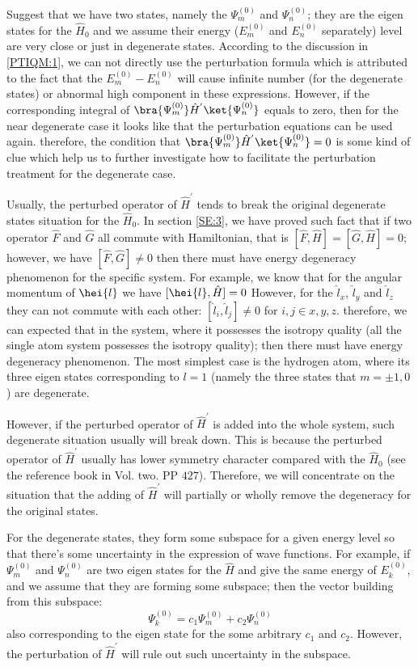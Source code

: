 Suggest that we have two states, namely the $\Psi_{m}^{(0)}$ and
$\Psi_{n}^{(0)}$; they are the eigen states for the $\hat{H}_{0}$
and we assume their energy ($E_{m}^{(0)}$ and $E_{n}^{(0)}$
separately) level are very close or just in degenerate states.
According to the discussion in \ref{PTIQM:1}, we can not directly
use the perturbation formula which is attributed to the fact that
the $E_{m}^{(0)} - E_{n}^{(0)}$ will cause infinite number (for the
degenerate states) or abnormal high component in these expressions.
However, if the corresponding integral of
$\bra{\Psi_{m}^{(0)}}\hat{H}^{'}\ket{\Psi_{n}^{(0)}}$ equals to
zero, then for the near degenerate case it looks like that the
perturbation equations can be used again. therefore, the condition
that $\bra{\Psi_{m}^{(0)}}\hat{H}^{'}\ket{\Psi_{n}^{(0)}} = 0$ is
some kind of clue which help us to further investigate how to
facilitate the perturbation treatment for the degenerate case.

Usually, the perturbed operator of $\hat{H}^{'}$ tends to break the
original degenerate states situation for the $\hat{H}_{0}$. In
section \ref{SE:3}, we have proved such fact that if two operator
$\hat{F}$ and $\hat{G}$ all commute with Hamiltonian, that is
$[\hat{F}, \hat{H}] = [\hat{G}, \hat{H}] = 0$; however, we have
$[\hat{F}, \hat{G}] \neq 0$ then there must have energy degeneracy
phenomenon for the specific system. For example, we know that for
the angular momentum of $\hei{l}$ we have $[\hei{l}, \hat{H}] = 0$
However, for the $\hat{l}_{x}$, $\hat{l}_{y}$ and $\hat{l}_{z}$ they
can not commute with each other: $[\hat{l}_{i}, \hat{l}_{j}] \neq 0$
for $i, j \in x, y, z$. therefore, we can expected that in the
system, where it possesses the isotropy quality (all the single atom
system possesses the isotropy quality); then there must have energy
degeneracy phenomenon. The most simplest case is the hydrogen atom,
where its three eigen states corresponding to $l=1$ (namely the
three states that $m= \pm 1, 0$) are degenerate.

However, if the perturbed operator of $\hat{H}^{'}$ is added into
the whole system, such degenerate situation usually will break down.
This is because the perturbed operator of $\hat{H}^{'}$ usually has
lower symmetry character compared with the $\hat{H}_{0}$ (see the
reference book \cite{ZengJinYan} in Vol. two. PP $427$). Therefore,
we will concentrate on the situation that the adding of
$\hat{H}^{'}$ will partially or wholly remove the degeneracy for the
original states.

For the degenerate states, they form some subspace for a given
energy level so that there's some uncertainty in the expression of
wave functions. For example, if $\Psi_{m}^{(0)}$ and
$\Psi_{n}^{(0)}$ are two eigen states for the $\hat{H}$ and give the
same energy of $E^{(0)}_{k}$, and we assume that they are forming
some subspace; then the vector building from this subspace:
\begin{equation}\label{}
\Psi_{k}^{(0)} = c_{1}\Psi_{m}^{(0)} + c_{2}\Psi_{n}^{(0)}
\end{equation}
also corresponding to the eigen state for the some arbitrary $c_{1}$
and $c_{2}$. However, the perturbation of $\hat{H}^{'}$ will rule
out such uncertainty in the subspace.

